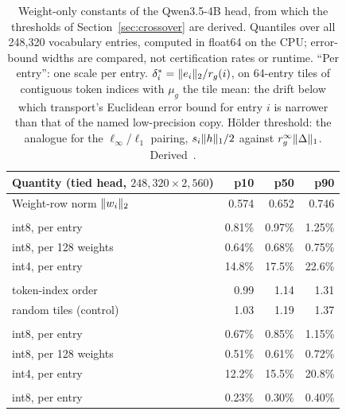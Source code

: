 \begin{table}[htbp]
\tablefont\centering
\caption{Weight-only constants of the Qwen3.5-4B head, from which the thresholds of Section~\ref{sec:crossover} are derived. Quantiles over all 248,320 vocabulary entries, computed in float64 on the CPU; error-bound widths are compared, not certification rates or runtime. ``Per entry'': one scale per entry. $\delta^\ast_i=\lVert e_i\rVert_2/r_g(i)$, on 64-entry tiles of contiguous token indices with $\mu_g$ the tile mean: the drift below which transport's Euclidean error bound for entry $i$ is narrower than that of the named low-precision copy. Hölder threshold: the analogue for the $\ell_\infty$/$\ell_1$ pairing, $s_i\lVert h\rVert_1/2$ against $r^\infty_g\lVert \Delta\rVert_1$. Derived~.}
\label{tab:headconstants}
\vskip 0.05in
\begin{tabular}{@{}lrrr@{}}\toprule
Quantity (tied head, $248{,}320\times2{,}560$) & p10 & p50 & p90\\\midrule
Weight-row norm $\lVert w_i\rVert_2$ & 0.574 & 0.652 & 0.746\\\addlinespace
\multicolumn{4}{@{}l}{\emph{Copy error, $\norm{e_i}_2/\norm{w_i}_2$}}\\
\quad int8, per entry & 0.81\% & 0.97\% & 1.25\%\\
\quad int8, per 128 weights & 0.64\% & 0.68\% & 0.75\%\\
\quad int4, per entry & 14.8\% & 17.5\% & 22.6\%\\\addlinespace
\multicolumn{4}{@{}l}{\emph{64-entry tile radius, $r_g/\norm{w_i}_2$}}\\
\quad token-index order & 0.99 & 1.14 & 1.31\\
\quad random tiles (control) & 1.03 & 1.19 & 1.37\\\addlinespace
\multicolumn{4}{@{}l}{\emph{Crossover drift $\delta^\ast$ against}}\\
\quad int8, per entry & 0.67\% & 0.85\% & 1.15\%\\
\quad int8, per 128 weights & 0.51\% & 0.61\% & 0.72\%\\
\quad int4, per entry & 12.2\% & 15.5\% & 20.8\%\\\addlinespace
\multicolumn{4}{@{}l}{\emph{Hölder threshold on $\norm\Delta_1/\norm h_1$ (Proposition~\ref{prop:holder-crossover}) against}}\\
\quad int8, per entry & 0.23\% & 0.30\% & 0.40\%\\\bottomrule
\end{tabular}
\end{table}

